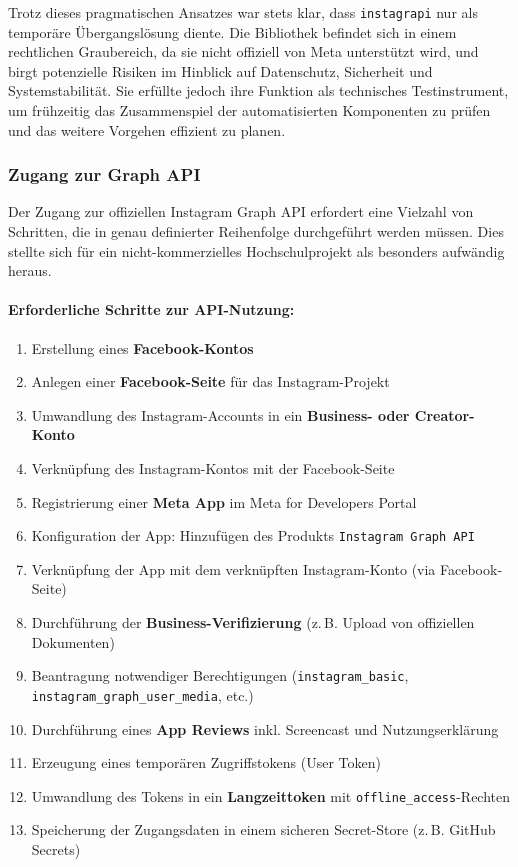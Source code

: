 \documentclass[a4paper,12pt]{article}
\begin{document}
Trotz dieses pragmatischen Ansatzes war stets klar, dass \texttt{instagrapi} nur als temporäre Übergangslösung diente. Die Bibliothek befindet sich in einem rechtlichen Graubereich, da sie nicht offiziell von Meta unterstützt wird, und birgt potenzielle Risiken im Hinblick auf Datenschutz, Sicherheit und Systemstabilität. Sie erfüllte jedoch ihre Funktion als technisches Testinstrument, um frühzeitig das Zusammenspiel der automatisierten Komponenten zu prüfen und das weitere Vorgehen effizient zu planen.

\subsubsection{Zugang zur Graph API}

Der Zugang zur offiziellen Instagram Graph API erfordert eine Vielzahl von Schritten, die in genau definierter Reihenfolge durchgeführt werden müssen. Dies stellte sich für ein nicht-kommerzielles Hochschulprojekt als besonders aufwändig heraus.

\paragraph{Erforderliche Schritte zur API-Nutzung:}
\begin{enumerate}
    \item Erstellung eines \textbf{Facebook-Kontos}
    \item Anlegen einer \textbf{Facebook-Seite} für das Instagram-Projekt
    \item Umwandlung des Instagram-Accounts in ein \textbf{Business- oder Creator-Konto}
    \item Verknüpfung des Instagram-Kontos mit der Facebook-Seite
    \item Registrierung einer \textbf{Meta App} im Meta for Developers Portal
    \item Konfiguration der App: Hinzufügen des Produkts \texttt{Instagram Graph API}
    \item Verknüpfung der App mit dem verknüpften Instagram-Konto (via Facebook-Seite)
    \item Durchführung der \textbf{Business-Verifizierung} (z.\,B. Upload von offiziellen Dokumenten)
    \item Beantragung notwendiger Berechtigungen (\texttt{instagram\_basic}, \texttt{instagram\_graph\_user\_media}, etc.)
    \item Durchführung eines \textbf{App Reviews} inkl. Screencast und Nutzungserklärung
    \item Erzeugung eines temporären Zugriffstokens (User Token)
    \item Umwandlung des Tokens in ein \textbf{Langzeittoken} mit \texttt{offline\_access}-Rechten
    \item Speicherung der Zugangsdaten in einem sicheren Secret-Store (z.\,B. GitHub Secrets)
\end{enumerate}
\end{document}
